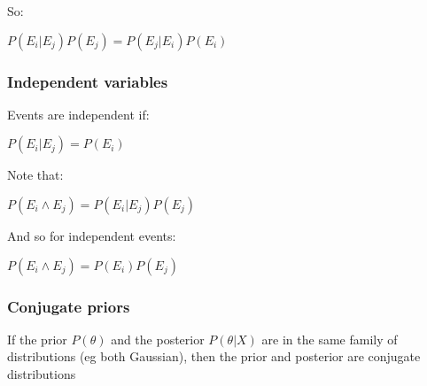 So:

$P(E_i|E_j)P(E_j)=P(E_j|E_i)P(E_i)$

\subsubsection{Independent variables}

Events are independent if:

$P(E_i|E_j)=P(E_i)$

Note that:

$P(E_i\land E_j)=P(E_i|E_j)P(E_j)$

And so for independent events:

$P(E_i\land E_j)=P(E_i)P(E_j)$

\subsubsection{Conjugate priors}

If the prior \(P(\theta)\) and the posterior \(P(\theta | X)\) are in the same family of distributions (eg both Gaussian), then the prior and posterior are conjugate distributions

